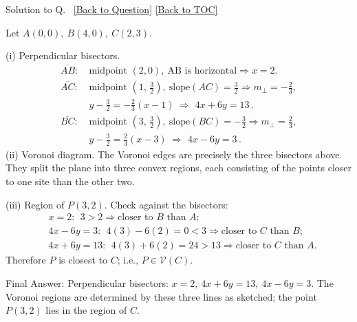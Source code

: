 \documentclass[11pt]{article}
\def\textbf#1{#1}%
\newcounter{question}
\newcounter{solutionNo} %
\newenvironment{solution}{
  \refstepcounter{solutionNo}%
  \hypertarget{sol-\thesolutionNo}{}%
  \par\noindent\textbf{Solution to Q\thesolutionNo.}~%
  \hyperlink{q-\thesolutionNo}{\small[Back to Question]}%
  \quad\hyperlink{toc}{\small[Back to TOC]}%
  \par\vspace{0.3em}%
}{\par}
\begin{document}
\begin{solution}
Let \(A(0,0),\ B(4,0),\ C(2,3)\).

\textbf{(i) Perpendicular bisectors.}
\[
\begin{aligned}
\overline{AB}:&\ \text{midpoint }(2,0),\ \text{AB is horizontal} \Rightarrow \boxed{x=2}.\\[2mm]
\overline{AC}:&\ \text{midpoint }(1,\,\tfrac32),\ \text{slope}(AC)=\tfrac32
\Rightarrow m_\perp=-\tfrac23,\\
&\ y-\tfrac32=-\tfrac23(x-1)\ \Longrightarrow\ \boxed{\,4x+6y=13\,}.\\[2mm]
\overline{BC}:&\ \text{midpoint }(3,\,\tfrac32),\ \text{slope}(BC)=-\tfrac32
\Rightarrow m_\perp=\tfrac23,\\
&\ y-\tfrac32=\tfrac23(x-3)\ \Longrightarrow\ \boxed{\,4x-6y=3\,}.
\end{aligned}
\]
\textbf{(ii) Voronoi diagram.}
The Voronoi edges are precisely the three bisectors above.  
They split the plane into three convex regions, each consisting of the points closer to one site than the other two.

\begin{center}
\end{center}

\textbf{(iii) Region of \(P(3,2)\).}
Check against the bisectors:
\[
\begin{aligned}
&x=2:\ \ 3>2 \Rightarrow \text{closer to }B\text{ than }A;\\
&4x-6y=3:\ \ 4(3)-6(2)=0<3 \Rightarrow \text{closer to }C\text{ than }B;\\
&4x+6y=13:\ \ 4(3)+6(2)=24>13 \Rightarrow \text{closer to }C\text{ than }A.
\end{aligned}
\]
Therefore \(P\) is closest to \(C\); i.e., \(P\in\mathcal V(C)\).

\textbf{Final Answer:}  
Perpendicular bisectors: \(\boxed{x=2},\ \boxed{4x+6y=13},\ \boxed{4x-6y=3}\).  
The Voronoi regions are determined by these three lines as sketched; the point \(P(3,2)\) lies in the region of \(C\).
\end{solution}
\end{document}
